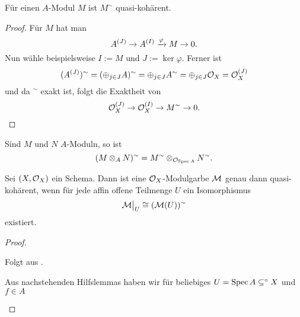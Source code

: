 \begin{korollar}
    \label{kor:m a modul dann m sim quaiskohaerent}
    Für einen $A$-Modul $M$ ist $M^\sim$ quasi-kohärent.
\end{korollar}
\begin{proof}
    Für $M$ hat man
    \[ A^{(J)} \to A^{(I)} \xrightarrow\varphi M \to 0.\]
    Nun wähle beispielsweise $I := M$ und $J := \ker\varphi$.
    Ferner ist 
    \[ (A^{(J)})^\sim = (\oplus_{j\in J}A)^\sim = \oplus_{j\in J}
        A^\sim = \oplus_{j  \in J} \mathcal{O}_X = \mathcal{O}_X^{(J)}\]
    und da $^\sim$ exakt ist, folgt die Exaktheit von
    \[ \mathcal{O}_X^{(J)} \to \mathcal{O}_X^{(I)} \to M^\sim \to 0.\] 
\end{proof}

\begin{bemerkung}
    Sind $M$ und $N$ $A$-Moduln, so ist
    \[ (M\otimes_A N)^\sim = M^\sim \otimes_{\mathcal{O}_{\operatorname{Spec} A}} N^\sim.\]
\end{bemerkung}

\begin{satz}
    Sei $(X,\mathcal{O}_X)$ ein Schema. Dann ist eine $\mathcal{O}_X$-Modulgarbe $\mathcal{M}$
    genau dann quasi-kohärent, wenn für jede affin offene Teilmenge
    $U$ ein Isomorphismus
    \[ \mathcal{M}\big|_{U} \cong (\mathcal{M}(U))^\sim\]
    existiert.
\end{satz}
\begin{proof}
    \begin{description mathquote}
    \item[\Leftarrow] Folgt aus .
    \item[\Rightarrow]
        Aus nachstehenden Hilfslemmas haben wir
        für beliebiges $U = \operatorname{Spec} A \subseteq^\circ X$ und $f\in A$ 
    \end{description mathquote}
\end{proof}

\pagebreak
